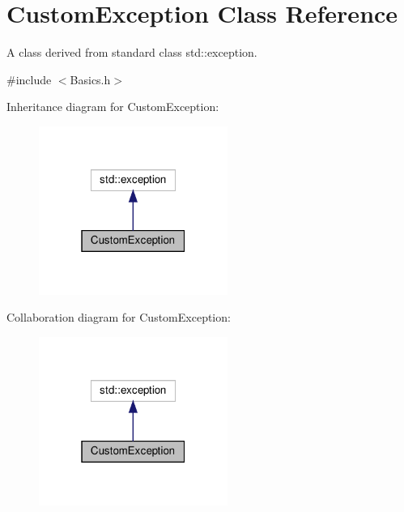 \hypertarget{classCustomException}{}\section{Custom\+Exception Class Reference}
\label{classCustomException}


A class derived from standard class {\ttfamily std\+::exception}.  




{\ttfamily \#include $<$Basics.\+h$>$}



Inheritance diagram for Custom\+Exception\+:\nopagebreak
\begin{figure}[H]
\begin{center}
\leavevmode
\includegraphics[width=175pt]{classCustomException__inherit__graph}
\end{center}
\end{figure}


Collaboration diagram for Custom\+Exception\+:\nopagebreak
\begin{figure}[H]
\begin{center}
\leavevmode
\includegraphics[width=175pt]{classCustomException__coll__graph}
\end{center}
\end{figure}
